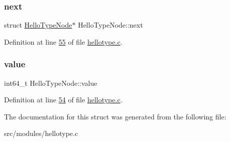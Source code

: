 \subsubsection{\texorpdfstring{next}{next}}
{\footnotesize\ttfamily struct \hyperlink{structHelloTypeNode}{Hello\+Type\+Node}$\ast$ Hello\+Type\+Node\+::next}



Definition at line \hyperlink{hellotype_8c_source_l00055}{55} of file \hyperlink{hellotype_8c_source}{hellotype.\+c}.

\mbox{\label{structHelloTypeNode_a0f5dd9dcd6c2a57377d9faa6c3d0ce08}} 
\subsubsection{\texorpdfstring{value}{value}}
{\footnotesize\ttfamily int64\+\_\+t Hello\+Type\+Node\+::value}



Definition at line \hyperlink{hellotype_8c_source_l00054}{54} of file \hyperlink{hellotype_8c_source}{hellotype.\+c}.



The documentation for this struct was generated from the following file\+:\begin{DoxyCompactItemize}
\item 
src/modules/hellotype.\+c\end{DoxyCompactItemize}
